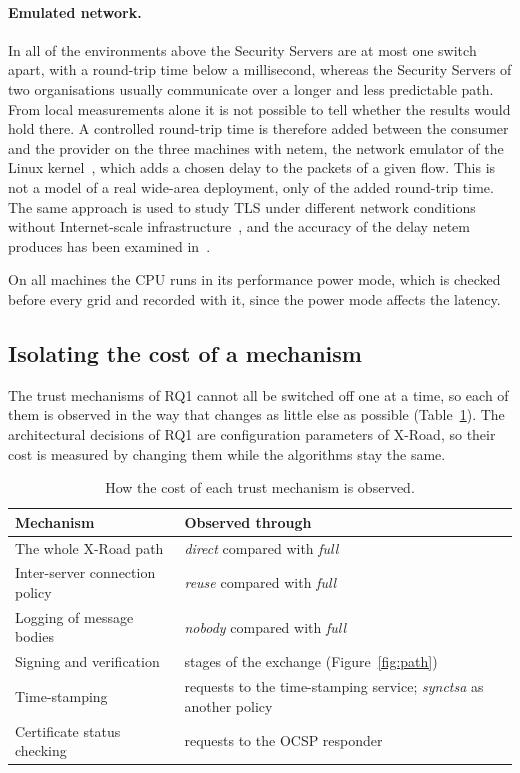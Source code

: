 \documentclass[conference,a4paper]{IEEEtran}
\newcommand{\newtext}[1]{{\color{blue}#1}}
\begin{document}
\paragraph{Emulated network.} In all of the environments above the Security Servers are at most
one switch apart, with a round-trip time below a millisecond, whereas the Security Servers of two
organisations usually communicate over a longer and less predictable path. From local measurements
alone it is not possible to tell whether the results would hold there. A controlled round-trip time
is therefore added between the consumer and the provider on the three machines with netem, the
network emulator of the Linux kernel~\cite{hemminger2005}, which adds a chosen delay to the packets of
a given flow. This is not a model of a real wide-area deployment, only of the added round-trip time. The same approach is used to study TLS under different network conditions without
Internet-scale infrastructure~\cite{paquin2020}, and the accuracy of the delay netem produces has
been examined in~\cite{nussbaum2009,jurgelionis2011}.

On all machines the CPU runs in its performance power mode, which is checked before every grid and
recorded with it, since the power mode affects the latency.

\subsection{Isolating the cost of a mechanism}\label{sec:iso}

The trust mechanisms of RQ1 cannot all be switched off one at a time, so each of them is observed
in the way that changes as little else as possible (Table~\ref{tab:mech}). \newtext{The architectural
decisions of RQ1 are configuration parameters of X-Road, so their cost is measured by changing them
while the algorithms stay the same.}

\begin{table}[t]
\centering\small
\caption{How the cost of each trust mechanism is observed.}
\label{tab:mech}
\begin{tabular}{@{}p{}p{}@{}}
\toprule
Mechanism & Observed through \\
\midrule
The whole X-Road path & \emph{direct} compared with \emph{full} \\
Inter-server connection policy & \emph{reuse} compared with \emph{full} \\
Logging of message bodies & \emph{nobody} compared with \emph{full} \\
Signing and verification & stages of the \newtext{exchange (Figure~\ref{fig:path})} \\
Time-stamping & requests to the time-stamping service; \emph{synctsa} as another policy \\
Certificate status checking & requests to the OCSP responder \\
\bottomrule
\end{tabular}
\end{table}
\end{document}
